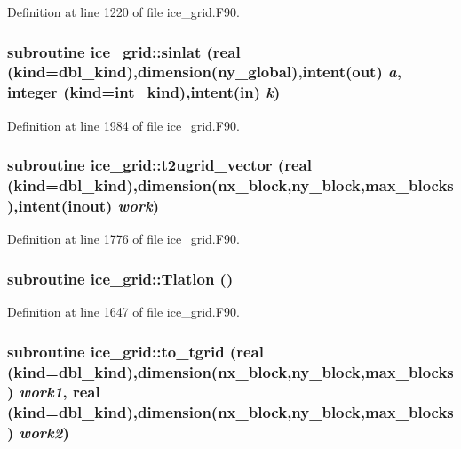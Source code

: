Definition at line 1220 of file ice\_\-grid.F90.\hypertarget{namespaceice__grid_ac06419b8058ea2a7164cf726ac07b544}{
\subsubsection[{sinlat}]{\setlength{\rightskip}{0pt plus 5cm}subroutine ice\_\-grid::sinlat (real (kind=dbl\_\-kind),dimension(ny\_\-global),intent(out) {\em a}, \/  integer (kind=int\_\-kind),intent(in) {\em k})}}
\label{namespaceice__grid_ac06419b8058ea2a7164cf726ac07b544}


Definition at line 1984 of file ice\_\-grid.F90.\hypertarget{namespaceice__grid_afcc1556abeece73115e27355f13c1f66}{
\subsubsection[{t2ugrid\_\-vector}]{\setlength{\rightskip}{0pt plus 5cm}subroutine ice\_\-grid::t2ugrid\_\-vector (real (kind=dbl\_\-kind),dimension(nx\_\-block,ny\_\-block,max\_\-blocks),intent(inout) {\em work})}}
\label{namespaceice__grid_afcc1556abeece73115e27355f13c1f66}


Definition at line 1776 of file ice\_\-grid.F90.\hypertarget{namespaceice__grid_a6d381958e459356fe9b135a76d3423e4}{
\subsubsection[{Tlatlon}]{\setlength{\rightskip}{0pt plus 5cm}subroutine ice\_\-grid::Tlatlon ()}}
\label{namespaceice__grid_a6d381958e459356fe9b135a76d3423e4}


Definition at line 1647 of file ice\_\-grid.F90.\hypertarget{namespaceice__grid_a63f5a2363aeb189e80ffb2294d20c42b}{
\subsubsection[{to\_\-tgrid}]{\setlength{\rightskip}{0pt plus 5cm}subroutine ice\_\-grid::to\_\-tgrid (real (kind=dbl\_\-kind),dimension(nx\_\-block,ny\_\-block,max\_\-blocks) {\em work1}, \/  real (kind=dbl\_\-kind),dimension(nx\_\-block,ny\_\-block,max\_\-blocks) {\em work2})}}
\label{namespaceice__grid_a63f5a2363aeb189e80ffb2294d20c42b}


